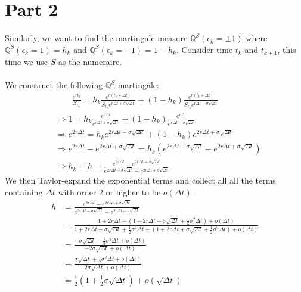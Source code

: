 \documentclass[12pt, letterpaper]{article}
\begin{document}
\section*{Part 2}
Similarly, we want to find the martingale measure $\mathbb{Q}^S(\epsilon_k = \pm 1)$ where $\mathbb{Q}^S(\epsilon_k =1) = h_k$ and $\mathbb{Q}^S(\epsilon_k =-1) = 1-h_k$. Consider 
time $t_k$ and $t_{k+1}$, this time we use $S$ as the numeraire. \\ \\
We construct the following $\mathbb{Q}^S$-martingale:
\begin{align*}
  &\qquad \frac{e^{rt_k}}{S_{t_k}} = h_k\frac{e^{r(t_k+\Delta t)}}{S_{t_k}e^{r\Delta t + \sigma \sqrt{\Delta t}}} + (1-h_k)\frac{e^{r(t_k+\Delta t)}}{S_{t_k}e^{r\Delta t - \sigma \sqrt{\Delta t}}}\\
  &\Rightarrow  1 = h_k\frac{e^{r\Delta t}}{e^{r\Delta t + \sigma \sqrt{\Delta t}}} + (1-h_k) \frac{e^{r\Delta t}}{e^{r\Delta t - \sigma \sqrt{\Delta t}}} \\
  &\Rightarrow e^{2r\Delta t} = h_ke^{2r\Delta t - \sigma \sqrt{\Delta t}} + (1-h_k)e^{2r\Delta t + \sigma \sqrt{\Delta t}}\\
  &\Rightarrow e^{2r\Delta t} - e^{2r\Delta t + \sigma \sqrt{\Delta t}} = h_k(e^{2r\Delta t - \sigma \sqrt{\Delta t}} - e^{2r\Delta t + \sigma \sqrt{\Delta t}}) \\
  &\Rightarrow h_k = h = \frac{e^{2r\Delta t} - e^{2r\Delta t + \sigma \sqrt{\Delta t}}}{e^{2r\Delta t - \sigma \sqrt{\Delta t}} - e^{2r\Delta t + \sigma \sqrt{\Delta t}}} \tag*{As $h_k$ does not depend on $k$}
\end{align*}
We then Taylor-expand the exponential terms and collect all all the terms containing $\Delta t$ with order 2 or higher to be $o(\Delta t)$:
\begin{align*}
  h &= \frac{e^{2r\Delta t} - e^{2r\Delta t + \sigma \sqrt{\Delta t}}}{e^{2r\Delta t - \sigma \sqrt{\Delta t}} - e^{2r\Delta t + \sigma \sqrt{\Delta t}}} \\
    &= \frac{1+2r\Delta t - (1+2r\Delta t+\sigma \sqrt{\Delta t} + \frac{1}{2} \sigma^2\Delta t) + o(\Delta t)}
        {1+2r\Delta t - \sigma \sqrt{\Delta t} + \frac{1}{2} \sigma^2\Delta t - (1+2r\Delta t+\sigma \sqrt{\Delta t} + \frac{1}{2} \sigma^2\Delta t) + o(\Delta t)}\\
    &= \frac{-\sigma \sqrt{\Delta t} - \frac{1}{2} \sigma^2\Delta t+ o(\Delta t)}{-2\sigma \sqrt{\Delta t} +o(\Delta t)}\\
    &= \frac{\sigma \sqrt{\Delta t} + \frac{1}{2} \sigma^2\Delta t+ o(\Delta t)}{2\sigma \sqrt{\Delta t} +o(\Delta t)}\\
    &= \frac{1}{2}(1+\frac{1}{2}\sigma \sqrt{\Delta t}) + o(\sqrt{\Delta t})
\end{align*}
\end{document}

